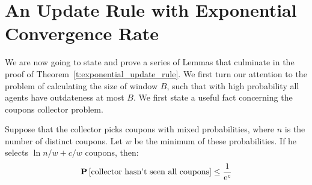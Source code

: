 \section{An Update Rule with Exponential Convergence Rate}\label{app:s:cc_convergence}
We are now going to state and prove a series of Lemmas that culminate in
the proof of Theorem~\ref{t:exponential_update_rule}. We first turn our attention to
the problem of calculating the size of window $B$, such that with high probability
all agents have outdateness at most $B$.
We first state a useful fact concerning the coupons collector problem.

\begin{lemma}\label{l:coupons_lemma}
Suppose that the collector picks coupons with mixed
probabilities, where $n$ is the number of distinct coupons.
Let $w$ be the minimum of these probabilities.
If he selects $\ln n/w+ c/w$ coupons, then:
$$
\bm{\mathrm{P}}\left[\text{collector hasn't seen all coupons}\right] \leq \frac{1}{\mathrm{e}^c}
$$
\end{lemma}

